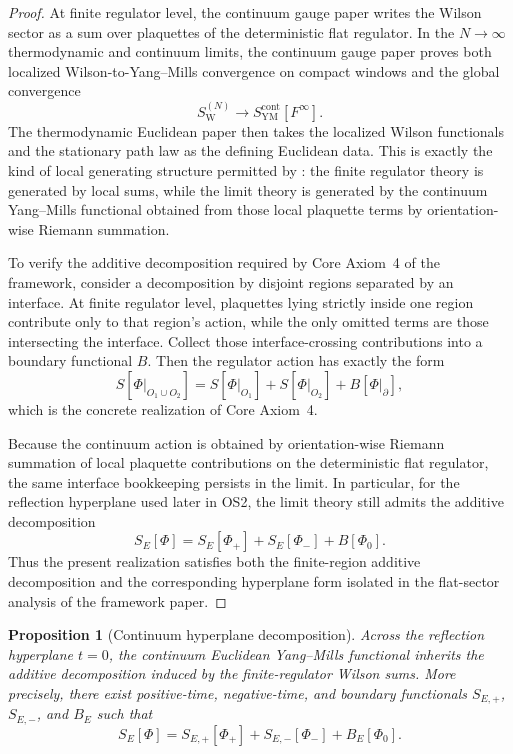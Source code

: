 \documentclass[11pt]{article}
\newtheorem{proposition}[theorem]{Proposition}
\theoremstyle{definition}
\theoremstyle{remark}
\begin{document}
\begin{proof}
At finite regulator level, the continuum gauge paper writes the Wilson sector as
a sum over plaquettes of the deterministic flat regulator.  In the
$N\to\infty$ thermodynamic and continuum limits, the continuum gauge paper
proves both localized Wilson-to-Yang--Mills convergence on compact windows and
the global convergence
\[
S_{\mathrm W}^{(N)}\to S_{\mathrm{YM}}^{\mathrm{cont}}[F^\infty].
\]
The thermodynamic Euclidean paper then takes the localized Wilson functionals
and the stationary path law as the defining Euclidean data.  This is exactly
the kind of local generating structure permitted by
\cite[Core Axiom~4 and Remarks on general local generators]{axioms}: the finite
regulator theory is generated by local sums, while the limit theory is
generated by the continuum Yang--Mills functional obtained from those local
plaquette terms by orientation-wise Riemann summation.

To verify the additive decomposition required by Core Axiom~4 of the framework,
consider a decomposition by disjoint regions separated by an interface.
At finite regulator level, plaquettes lying strictly inside one region
contribute only to that region's action, while the only omitted terms are those
intersecting the interface.  Collect those interface-crossing contributions
into a boundary functional $B$.  Then the regulator action has
exactly the form
\[
S[\Phi|_{O_1\cup O_2}]
=
S[\Phi|_{O_1}]+S[\Phi|_{O_2}]+B[\Phi|_{\partial}],
\]
which is the concrete realization of Core Axiom~4.

Because the continuum action is obtained by orientation-wise Riemann summation
of local plaquette contributions on the deterministic flat regulator, the same
interface bookkeeping persists in the limit.  In particular, for the reflection
hyperplane used later in OS2, the limit theory still admits the additive
decomposition
\[
S_E[\Phi]=S_E[\Phi_+]+S_E[\Phi_-]+B[\Phi_0].
\]
Thus the present realization satisfies both the finite-region additive
decomposition and the corresponding hyperplane form isolated in the flat-sector
analysis of the framework paper.
\end{proof}

\begin{proposition}[Continuum hyperplane decomposition]
\label{prop:continuum-hyperplane}
Across the reflection hyperplane \(t=0\), the continuum Euclidean
Yang--Mills functional inherits the additive decomposition induced by the
finite-regulator Wilson sums.  More precisely, there exist positive-time,
negative-time, and boundary functionals \(S_{E,+}\), \(S_{E,-}\), and \(B_E\)
such that
\[
S_E[\Phi]=S_{E,+}[\Phi_+]+S_{E,-}[\Phi_-]+B_E[\Phi_0].
\]
\end{proposition}
\end{document}
